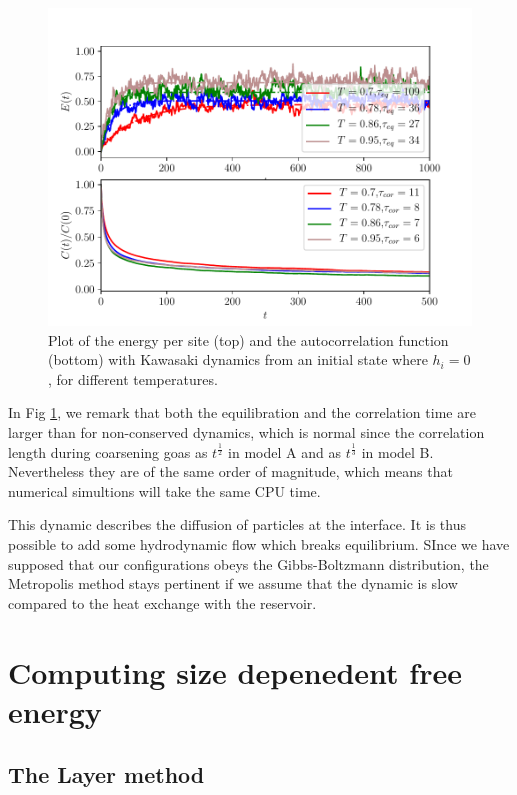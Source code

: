 \begin{figure}[t]
	\centering
	\includegraphics[scale=1]{numerical/sos-kaw-eq-cor.pdf}
	\caption{Plot of the energy per site (top) and the autocorrelation function (bottom) with Kawasaki dynamics from an initial state where $h_i=0$, for different temperatures.}
	\label{eq-kaw}
\end{figure}
In Fig \ref{eq-kaw}, we remark that both the equilibration and the correlation time are larger than for non-conserved dynamics, which is normal since the correlation length during coarsening goas as $t^\frac{1}{2}$ in model A and as $t^\frac{1}{3}$ in model B. Nevertheless they are of the same order of magnitude, which means that numerical simultions will take the same CPU time.

This dynamic describes the diffusion of particles at the interface. It is thus possible to add some hydrodynamic flow which breaks equilibrium. SInce we have supposed that our configurations obeys the Gibbs-Boltzmann distribution, the Metropolis method stays pertinent if we assume that the dynamic is slow compared to the heat exchange with the reservoir.

    \section{Computing size depenedent free energy}

    \subsection{The Layer method}

